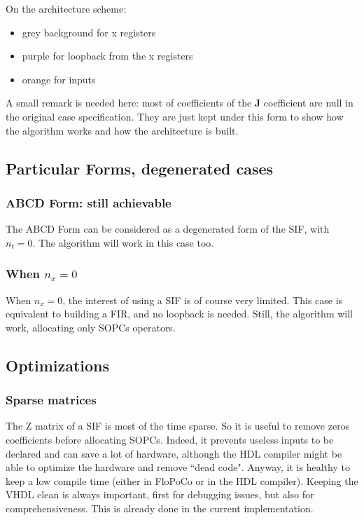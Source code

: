 	On the architecture scheme: \vspace{-7pt}
	\begin{itemize}
		\item grey background for x registers \vspace{-8pt}
		\item purple for loopback from the x registers \vspace{-8pt}
		\item orange for inputs \vspace{-8pt}
	\end{itemize}
	
	A small remark is needed here:
	most of coefficients of the $\boldsymbol{J}$ coefficient are null in the original case specification.
	They are just kept under this form to show how the algorithm works and how the architecture is built.
	

\subsection{Particular Forms, degenerated cases}
	\subsubsection{ABCD Form: still achievable}
	The ABCD Form can be considered as a degenerated form of the SIF, with $n_t=0$.
	The algorithm will work in this case too.
	\subsubsection{When $n_x=0$}
	When $n_x=0$, the interest of using a SIF is of course very limited.
	This case is equivalent to building a FIR, and no loopback is needed.
	Still, the algorithm will work, allocating only SOPCs operators.
	
\subsection{Optimizations}
	\subsubsection{Sparse matrices}
		The Z matrix of a SIF is most of the time sparse.
		So it is useful to remove zeros coefficients before allocating SOPCs.
		Indeed, it prevents useless inputs to be declared and can save a lot of hardware,
		although the HDL compiler might be able to optimize the hardware and remove ``dead code".
		Anyway, it is healthy to keep a low compile time (either in FloPoCo or in the HDL compiler).
		Keeping the VHDL clean is always important, first for debugging issues, but also for comprehensiveness.
		This is already done in the current implementation.

